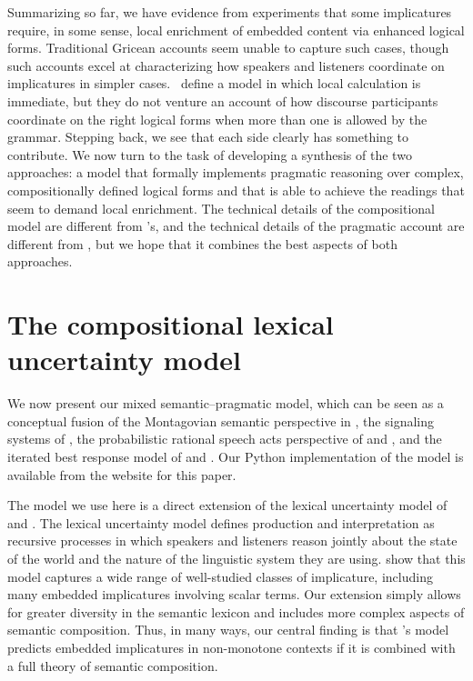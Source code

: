 \documentclass[leqno,12pt]{article}
\begin{document}
Summarizing so far, we have evidence from
 experiments that some implicatures
require, in some sense, local enrichment of embedded content via
enhanced logical forms. Traditional Gricean accounts seem unable to capture such
cases, though such accounts excel at characterizing how speakers and
listeners coordinate on implicatures in simpler cases. \CFS\ define a
model in which local calculation is immediate, but they do not venture
an account of how discourse participants coordinate on the right
logical forms when more than one is allowed by the grammar. Stepping
back, we see that each side clearly has something to contribute. We
now turn to the task of developing a synthesis of the two approaches:
a model that formally implements pragmatic reasoning over complex,
compositionally defined logical forms and that is able to achieve the
readings that seem to demand local enrichment. The technical details
of the compositional model are different from \CFS's, and the
technical details of the pragmatic account are different from
\citeauthor{Grice75}, but we hope that it combines the best aspects of
both approaches.


\section{The compositional lexical uncertainty model}\label{sec:model}


We now present our mixed semantic--pragmatic model, which can be seen
as a conceptual fusion of the Montagovian semantic perspective in
\citet{Lewis70GS}, the signaling systems of \citet{Lewis69}, the
probabilistic rational speech acts perspective of
\citet{Frank:Goodman:2012} and \citet{Goodman:Stuhlmuller:2013}, and
the iterated best response model of \citet{Jaeger:2007,Jaeger:2011}
and \citet{Franke09DISS}.  Our Python implementation of the model is
available from the website for this paper.

The model we use here is a direct extension of the lexical uncertainty
model of \citet{Bergen:Goodman:Levy:2012} and
\citet{Bergen:Levy:Goodman:2014}. The lexical uncertainty model
defines production and interpretation as recursive processes in which
speakers and listeners reason jointly about the state of the world and
the nature of the linguistic system they are
using. \citeauthor{Bergen:Levy:Goodman:2014} show that this model
captures a wide range of well-studied classes of implicature,
including many embedded implicatures involving scalar terms. Our
extension simply allows for greater diversity in the semantic lexicon
and includes more complex aspects of semantic composition. Thus, in
many ways, our central finding is that
\citeauthor{Bergen:Levy:Goodman:2014}'s model predicts embedded
implicatures in non-monotone contexts if it is combined with a full
theory of semantic composition.
\end{document}
